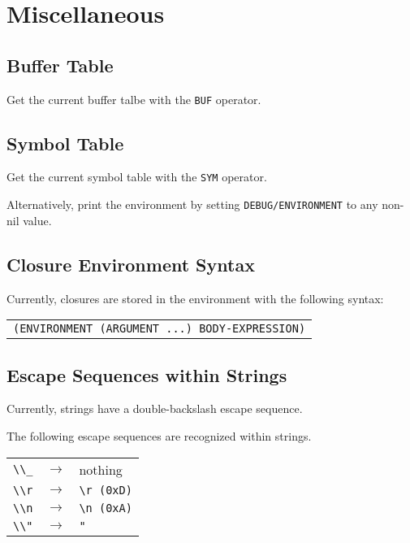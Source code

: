 \documentclass[
letterpaper,
oneside,
]{memoir}
\begin{document}
\chapter{Miscellaneous}

\section{Buffer Table}

Get the current buffer talbe with the \texttt{BUF} operator.

\section{Symbol Table}

Get the current symbol table with the \texttt{SYM} operator.

\vspace{1em}
\noindent
Alternatively, print the environment by setting \texttt{DEBUG/ENVIRONMENT} to any non-nil value.

\section{Closure Environment Syntax}

Currently, closures are stored in the environment with the following syntax:

\vspace{1em}
\begin{tabular}{l}
  \texttt{(ENVIRONMENT (ARGUMENT ...) BODY-EXPRESSION)} \\
\end{tabular}

\section{Escape Sequences within Strings}

Currently, strings have a double-backslash escape sequence.

\vspace{1em}
\noindent
The following escape sequences are recognized within strings.

\begin{center}
  \begin{tabular}{rcl}
    \verb|\\_| & $\rightarrow$ & nothing \\
    \verb|\\r| & $\rightarrow$ & \verb|\r (0xD)| \\
    \verb|\\n| & $\rightarrow$ & \verb|\n (0xA)| \\
    \verb|\\"| & $\rightarrow$ & \verb|"| \\
  \end{tabular}
\end{center}
\end{document}
